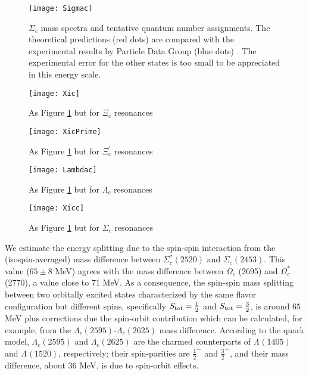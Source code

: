 \documentclass[twocolumn,superscriptaddress,preprintnumbers,nofootinbib]{revtex4}
\begin{document}
\begin{figure}[htbp]
\caption{$\Sigma_c$ mass spectra and tentative quantum number assignments. The theoretical predictions (red dots) are compared with the experimental results by  Particle Data Group (blue dots) \cite{Tanabashi:2018oca}. The experimental error for the other states is too small to be appreciated in this energy scale.}
\begin{center}
\texttt{[image: Sigmac]}
\label{spectrumSc}
\end{center}
\end{figure}  

\begin{figure}[htbp]
\caption{ As Figure \ref{spectrumSc} but for $\Xi_c$ resonances}
\begin{center}
\texttt{[image: Xic]}
\label{spectrumXic}
\end{center}
\end{figure}  

\begin{figure}[htbp]
\caption{ As Figure \ref{spectrumSc} but for $\Xi^\prime_c$ resonances}
\begin{center}
\texttt{[image: XicPrime]}
\label{spectrumXicprime}
\end{center}
\end{figure}  

\begin{figure}[htbp]
\caption{ As Figure \ref{spectrumSc} but for $\Lambda_c$ resonances}
\begin{center}
\texttt{[image: Lambdac]}
\label{spectrumLambda}
\end{center}
\end{figure}  


\begin{figure}[htbp]
\caption{ As Figure \ref{spectrumSc} but for $\Sigma_{c}$ resonances}
\begin{center}
\texttt{[image: Xicc]}
\label{spectrumXicc}
\end{center}
\end{figure}




We estimate the energy splitting due to the spin-spin interaction from the (isospin-averaged) mass difference between $\Sigma_{c}^*(2520)$  and $\Sigma_{c}(2453)$. This value ($65 \pm 8$ MeV) agrees with the mass difference between $\Omega_{c}$ (2695) and $\Omega_{c}^*$ (2770), a value close to $71$ MeV. 
As a consequence, the spin-spin mass splitting between two  orbitally excited states characterized by the same flavor configuration but different spins, specifically $S_{\rm tot}=\frac{1}{2}$ and $S_{\rm tot}=\frac{3}{2}$, is around $65$ MeV plus corrections due the spin-orbit contribution which can be calculated, for example, from the $\Lambda_{ c}(2595)$-$\Lambda_{ c}(2625)$ mass difference. 
According to the quark model, $\Lambda_{ c}(2595)$ and $\Lambda_{ c}(2625)$ are the charmed counterparts of $\Lambda_{ }(1405)$ and $\Lambda_{ }(1520)$, respectively; their spin-parities are $\frac{1}{2}^{-}$ and $\frac{3}{2}^{-}$, and their mass difference, about 36 MeV, is due to spin-orbit effects.  
\end{document}
